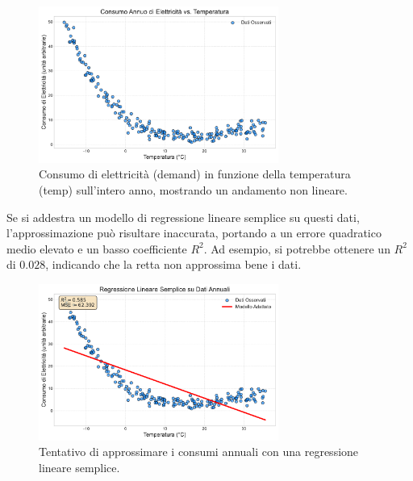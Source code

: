 \documentclass{article}
\begin{document}
\begin{figure}[H]
    \centering
    \includegraphics[width=0.7\textwidth]{images/electricity_yearly_scatter.pdf}
    \caption{Consumo di elettricità (demand) in funzione della temperatura (temp) sull'intero anno, mostrando un andamento non lineare.}
    \label{fig:electricity_yearly_scatter}
\end{figure}

Se si addestra un modello di regressione lineare semplice su questi dati, l'approssimazione può risultare inaccurata, portando a un errore quadratico medio elevato e un basso coefficiente $R^2$. Ad esempio, si potrebbe ottenere un $R^2$ di $0.028$, indicando che la retta non approssima bene i dati.

\begin{figure}[H]
    \centering
    \includegraphics[width=0.7\textwidth]{images/electricity_yearly_linear_fit.pdf}
    \caption{Tentativo di approssimare i consumi annuali con una regressione lineare semplice.}
    \label{fig:electricity_yearly_linear_fit}
\end{figure}
\end{document}
